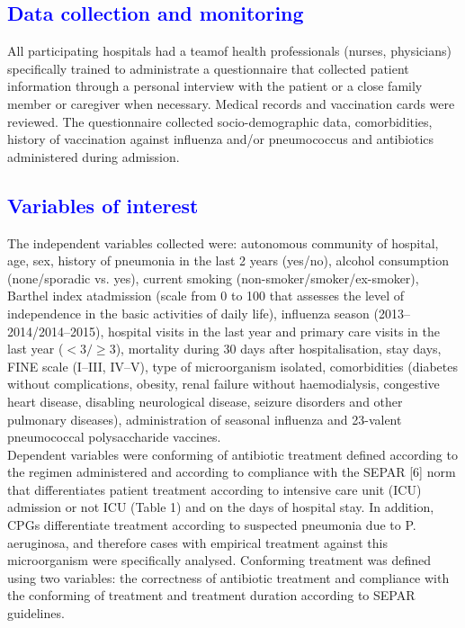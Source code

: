 \documentclass[11pt, a4paper]{article}
\begin{document}
\begin{multicols}{2}
\subsection*{\textcolor{blue}{Data collection and monitoring}}
All participating hospitals had a teamof health professionals (nurses, physicians) specifically trained to administrate a questionnaire that collected patient information through a personal interview with the patient or a close family member or caregiver when
necessary. Medical records and vaccination cards were reviewed. The questionnaire collected socio-demographic data, comorbidities, history of vaccination against influenza and/or
pneumococcus and antibiotics administered during admission.

\subsection*{\textcolor{blue}{Variables of interest}}
The independent variables collected were: autonomous community of hospital, age, sex, history of pneumonia in the last 2 years (yes/no), alcohol consumption (none/sporadic vs. yes), current smoking (non-smoker/smoker/ex-smoker), Barthel index atadmission (scale from 0 to 100 that assesses the level of independence in the basic activities of daily life), influenza season (2013–2014/2014–2015), hospital visits in the last year and primary
care visits in the last year ($<3/\geq$3), mortality during 30 days after hospitalisation, stay days, FINE scale (I–III, IV–V), type of microorganism isolated, comorbidities (diabetes without complications, obesity, renal failure without haemodialysis, congestive
heart disease, disabling neurological disease, seizure disorders and other pulmonary diseases), administration of seasonal influenza and 23-valent pneumococcal polysaccharide vaccines.\\

Dependent variables were conforming of antibiotic treatment defined according to the regimen administered and according to compliance with the SEPAR [6] norm that differentiates patient treatment according to intensive care unit (ICU) admission or not ICU (Table 1) and on the days of hospital stay. In addition, CPGs differentiate treatment according to suspected pneumonia due to P. aeruginosa, and therefore cases with empirical treatment against this microorganism were specifically analysed. Conforming treatment was defined using two variables: the correctness of antibiotic treatment and compliance with the conforming of treatment and treatment duration according to SEPAR guidelines.


\end{multicols}
\end{document}
